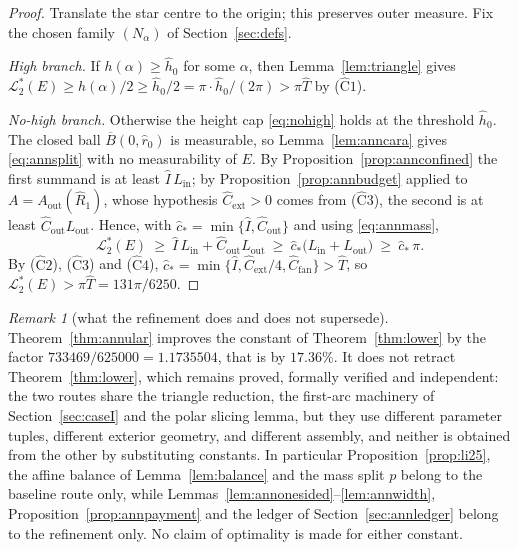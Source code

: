 \documentclass[11pt]{article}
\theoremstyle{plain}
\theoremstyle{definition}
\theoremstyle{remark}
\newtheorem{remark}[theorem]{Remark}
\newcommand{\Lout}{\mathcal{L}^{*}_{2}}
\newcommand{\Aout}{A_{\mathrm{out}}}
\begin{document}
\begin{proof}
Translate the star centre to the origin; this preserves outer measure. Fix the
chosen family $(N_{\alpha})$ of Section~\ref{sec:defs}.

\emph{High branch.} If $h(\alpha)\ge\hat h_{0}$ for some $\alpha$, then
Lemma~\ref{lem:triangle} gives
$\Lout(E)\ge h(\alpha)/2\ge\hat h_{0}/2
=\pi\cdot\hat h_{0}/(2\pi)>\pi\hat T$ by ($\widehat{\mathrm{C}}1$).

\emph{No-high branch.} Otherwise the height cap \eqref{eq:nohigh} holds at the
threshold $\hat h_{0}$. The closed ball $\overline B(0,\hat r_{0})$ is
measurable, so Lemma~\ref{lem:anncara} gives \eqref{eq:annsplit} with no
measurability of $E$. By Proposition~\ref{prop:annconfined} the first summand is
at least $\hat I\,L_{\mathrm{in}}$; by Proposition~\ref{prop:annbudget} applied
to $A=\Aout(\hat R_{1})$, whose hypothesis $\hat C_{\mathrm{ext}}>0$ comes from
($\widehat{\mathrm{C}}3$), the second is at least
$\hat C_{\mathrm{out}}L_{\mathrm{out}}$. Hence, with
$\hat c_{*}=\min\{\hat I,\hat C_{\mathrm{out}}\}$ and using
\eqref{eq:annmass},
\[
  \Lout(E)\ \ge\ \hat I\,L_{\mathrm{in}}
    +\hat C_{\mathrm{out}}L_{\mathrm{out}}
  \ \ge\ \hat c_{*}\bigl(L_{\mathrm{in}}+L_{\mathrm{out}}\bigr)
  \ \ge\ \hat c_{*}\,\pi .
\]
By ($\widehat{\mathrm{C}}2$), ($\widehat{\mathrm{C}}3$) and
($\widehat{\mathrm{C}}4$),
$\hat c_{*}=\min\{\hat I,\hat C_{\mathrm{ext}}/4,\hat C_{\mathrm{fan}}\}
>\hat T$, so $\Lout(E)>\pi\hat T=131\pi/6250$.
\end{proof}

\begin{remark}[what the refinement does and does not supersede]\label{rem:annstatus}
Theorem~\ref{thm:annular} improves the constant of Theorem~\ref{thm:lower} by
the factor $733469/625000=1.1735504$, that is by $17.36\%$. It does not retract
Theorem~\ref{thm:lower}, which remains proved, formally verified and
independent: the two routes share the triangle reduction, the first-arc
machinery of Section~\ref{sec:caseI} and the polar slicing lemma, but they use
different parameter tuples, different exterior geometry, and different
assembly, and neither is obtained from the other by substituting constants. In
particular Proposition~\ref{prop:li25}, the affine balance of
Lemma~\ref{lem:balance} and the mass split $p$ belong to the baseline route
only, while Lemmas~\ref{lem:annonesided}--\ref{lem:annwidth},
Proposition~\ref{prop:annpayment} and the ledger of
Section~\ref{sec:annledger} belong to the refinement only. No claim of
optimality is made for either constant.
\end{remark}
\end{document}
